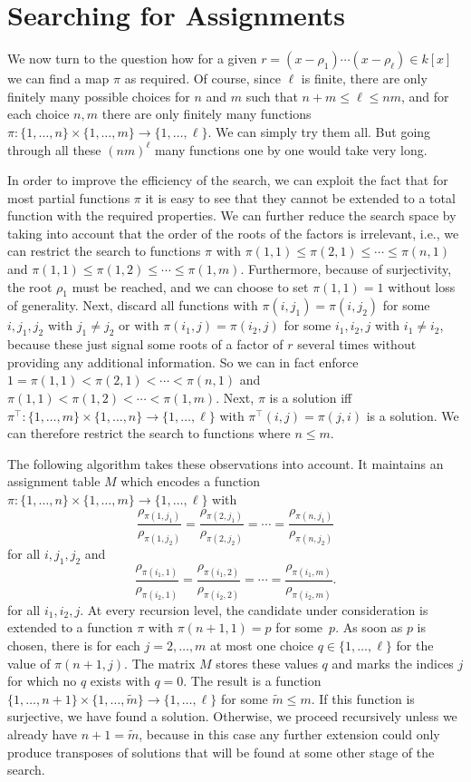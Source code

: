 \documentclass{sig-alternate}
\begin{document}
\section{Searching for Assignments}\label{sec:search}

We now turn to the question how for a given $r=(x-\rho_1)\cdots(x-\rho_\ell)\in
k[x]$ we can find a map $\pi$ as required. Of course, since $\ell$ is finite,
there are only finitely many possible choices for $n$ and $m$ such that
$n+m\leq\ell\leq nm$, and for each choice $n,m$ there are only finitely many
functions $\pi\colon\{1,\dots,n\}\times\{1,\dots,m\}\to\{1,\dots,\ell\}$. We can
simply try them all. But going through all these $(nm)^\ell$ many functions one
by one would take very long.

In order to improve the efficiency of the search, we can exploit the fact that
for most partial functions $\pi$ it is easy to see that they cannot be extended
to a total function with the required properties. We can further reduce the
search space by taking into account that the order of the roots of the factors
is irrelevant, i.e., we can restrict the search to functions $\pi$ with
$\pi(1,1)\leq\pi(2,1)\leq\cdots\leq\pi(n,1)$ and
$\pi(1,1)\leq\pi(1,2)\leq\cdots\leq\pi(1,m)$. Furthermore, because of
surjectivity, the root $\rho_1$ must be reached, and we can choose to set
$\pi(1,1)=1$ without loss of generality. Next, discard all functions with
$\pi(i,j_1)=\pi(i,j_2)$ for some $i,j_1,j_2$ with $j_1\neq j_2$ or with
$\pi(i_1,j)=\pi(i_2,j)$ for some $i_1,i_2,j$ with $i_1\neq i_2$, because these
just signal some roots of a factor of $r$ several times without providing any
additional information. So we can in fact enforce
$1=\pi(1,1)<\pi(2,1)<\cdots<\pi(n,1)$ and $\pi(1,1)<\pi(1,2)<\cdots<\pi(1,m)$.
Next, $\pi$ is a solution iff
$\pi^\top\colon\{1,\dots,m\}\times\{1,\dots,n\}\to\{1,\dots,\ell\}$ with
$\pi^\top(i,j)=\pi(j,i)$ is a solution. We can therefore restrict the search to
functions where $n\leq m$. 

The following algorithm takes these observations into account. It maintains an
assignment table $M$ which encodes a function~$\pi\colon
\{1,\dots,n\}\times\{1,\dots,m\}\to\{1,\dots,\ell\}$ with
\[
\frac{\rho_{\pi(1,j_1)}}{\rho_{\pi(1,j_2)}}=\frac{\rho_{\pi(2,j_1)}}{\rho_{\pi(2,j_2)}}=\cdots=\frac{\rho_{\pi(n,j_1)}}{\rho_{\pi(n,j_2)}}
\]
for all $i,j_1,j_2$ and
\[
\frac{\rho_{\pi(i_1,1)}}{\rho_{\pi(i_2,1)}}=\frac{\rho_{\pi(i_1,2)}}{\rho_{\pi(i_2,2)}}=\cdots=\frac{\rho_{\pi(i_1,m)}}{\rho_{\pi(i_2,m)}}.
\]
for all $i_1,i_2,j$. At every recursion level, the candidate under
consideration is extended to a function $\pi$ with $\pi(n+1,1)=p$ for
some~$p$. As soon as $p$ is chosen, there is for each $j=2,\dots,m$ at most one
choice $q\in\{1,\dots,\ell\}$ for the value of $\pi(n+1,j)$. The matrix $M$
stores these values $q$ and marks the indices $j$ for which no $q$ exists with
$q=0$. The result is a function $\{1,\dots,n+1\}\times\{1,\dots,\tilde
m\}\to\{1,\dots,\ell\}$ for some $\tilde m\leq m$.  If this function is
surjective, we have found a solution.  Otherwise, we proceed recursively unless
we already have $n+1=\tilde m$, because in this case any further extension could
only produce transposes of solutions that will be found at some other stage of
the search.
\end{document}
